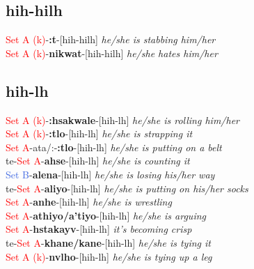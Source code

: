 \documentclass[oneside,openany]{book}%
\begin{document}
\subsection*{hih-hilh}%
\textcolor{Red}{Set A (k)}{-}\textbf{:t}{-}[hih-hilh] \textit{ he/she is stabbing him/her} \\%
\textcolor{Red}{Set A (k)}{-}\textbf{nikwat}{-}[hih-hilh] \textit{ he/she hates him/her} \\%
\vspace{1em}%
\needspace{1in}%
\subsection*{hih-lh}%
\textcolor{Red}{Set A (k)}{-}\textbf{:hsakwale}{-}[hih-lh] \textit{ he/she is rolling him/her} \\%
\textcolor{Red}{Set A (k)}{-}\textbf{:tlo}{-}[hih-lh] \textit{ he/she is strapping it} \\%
\textcolor{Red}{Set A}{-}ata/:{-}\textbf{:tlo}{-}[hih-lh] \textit{ he/she is putting on a belt} \\%
te{-}\textcolor{Red}{Set A}{-}\textbf{ahse}{-}[hih-lh] \textit{ he/she is counting it} \\%
\textcolor{RoyalBlue}{Set B}{-}\textbf{alena}{-}[hih-lh] \textit{ he/she is losing his/her way} \\%
te{-}\textcolor{Red}{Set A}{-}\textbf{aliyo}{-}[hih-lh] \textit{ he/she is putting on his/her socks} \\%
\textcolor{Red}{Set A}{-}\textbf{anhe}{-}[hih-lh] \textit{ he/she is wrestling} \\%
\textcolor{Red}{Set A}{-}\textbf{athiyo/a'tiyo}{-}[hih-lh] \textit{ he/she is arguing} \\%
\textcolor{Red}{Set A}{-}\textbf{hstakayv}{-}[hih-lh] \textit{ it's becoming crisp} \\%
te{-}\textcolor{Red}{Set A}{-}\textbf{khane/kane}{-}[hih-lh] \textit{ he/she is tying it} \\%
\textcolor{Red}{Set A (k)}{-}\textbf{nvlho}{-}[hih-lh] \textit{ he/she is tying up a leg} \\%
\vspace{1em}%
\needspace{1in}%
\end{document}

